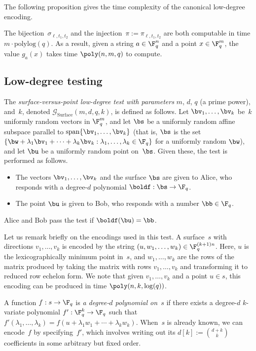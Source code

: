 \documentclass[11pt]{article}
\newcommand{\game}{\mathscr{G}}
\begin{document}
The following proposition gives the time complexity of the canonical low-degree encoding.

\begin{proposition}\label{prop:canonical-time}
The bijection~$\sigma_{\ell, t_1, t_2}$ and the injection~$\pi:=\pi_{\ell, t_1, t_2}$ are both computable in time $m \cdot \mathrm{poly log}(q)$.
As a result, given a string $a \in \F_q^n$ and a point $x \in \F_q^m$, the value $g_a(x)$ takes time $\poly(n, m, q)$ to compute.
\end{proposition}

\subsection{Low-degree testing}

\begin{definition}
The \emph{surface-versus-point low-degree test with parameters} $m$, $d$, $q$ (a prime power), and~$k$, denoted $\game_{\mathrm{Surface}}(m, d, q, k)$, is defined as follows.
Let $\bv_1, \ldots,\bv_k$ be~$k$ uniformly random vectors in $\F_q^m$, and
let $\bs$ be a uniformly random affine subspace parallel to
$\mathrm{span}\{\bv_1, \ldots, \bv_k\}$ (that is, $\bs$ is the set $\{\bw + \lambda_1 \bv_1 +\cdots
+\lambda_k \bv_k : \lambda_1, \ldots, \lambda_k \in \F_q\}$ for a uniformly
random $\bw$),
and let $\bu$ be a uniformly random point on~$\bs$.
Given these, the test is performed as follows.
\begin{itemize}
\itemsep -.5pt
\item[$\circ$] The vectors $\bv_1, \ldots, \bv_k$ and the surface $\bs$ are given to Alice, who responds with a degree-$d$ polynomial $\boldf: \bs \rightarrow \F_q$.
\item[$\circ$] The point $\bu$ is given to Bob, who responds with a number $\bb \in \F_q$.
\end{itemize}
Alice and Bob pass the test if $\boldf(\bu) = \bb$.
\end{definition}

\begin{remark}
Let us remark briefly on the encodings used in this test.
A surface~$s$ with directions $v_1, \ldots, v_k$
is encoded by the string $(u, w_1, \ldots, w_k) \in \F_q^{(k+1) n}$.
Here, $u$ is the lexicographically minimum point in~$s$,
and $w_1, \ldots, w_k$ are the rows of the matrix produced by taking the matrix with rows $v_1, \ldots, v_k$
and transforming it to reduced row echelon form.
We note that given $v_1, \ldots, v_k$ and a point $u \in s$,
this encoding can be produced in time $\poly(n, k, \log(q))$.

A function $f:s\rightarrow \F_q$ is \emph{a degree-$d$ polynomial on~$s$}
if there exists a degree-$d$ $k$-variate polynomial $f':\F_q^k \rightarrow \F_q$
such that $f'(\lambda_1, \ldots, \lambda_k) = f(u + \lambda_1 w_1 + \cdots + \lambda_k w_k)$.
When~$s$ is already known, we can encode~$f$ by specifying~$f'$,
which involves writing out its $d[k] := \binom{d+k}{k}$ coefficients in some arbitrary but fixed order.
\end{remark}
\end{document}
